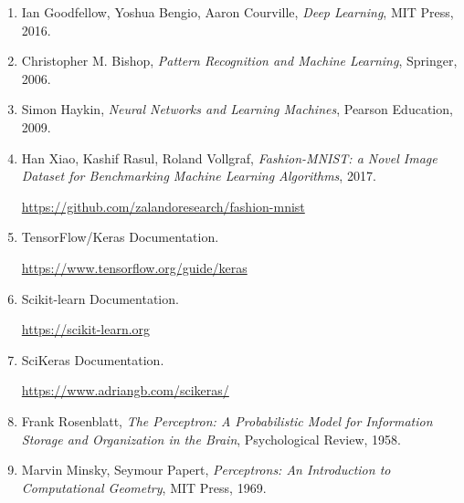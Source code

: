 \documentclass[11pt,a4paper]{article}
\begin{document}
\begin{enumerate}

\item Ian Goodfellow,
Yoshua Bengio,
Aaron Courville,
\textit{Deep Learning},
MIT Press,
2016.

\item Christopher M. Bishop,
\textit{Pattern Recognition and Machine Learning},
Springer,
2006.

\item Simon Haykin,
\textit{Neural Networks and Learning Machines},
Pearson Education,
2009.

\item Han Xiao, Kashif Rasul, Roland Vollgraf,
\textit{Fashion-MNIST: a Novel Image Dataset for Benchmarking Machine Learning Algorithms},
2017.

\url{https://github.com/zalandoresearch/fashion-mnist}

\item TensorFlow/Keras Documentation.

\url{https://www.tensorflow.org/guide/keras}

\item Scikit-learn Documentation.

\url{https://scikit-learn.org}

\item SciKeras Documentation.

\url{https://www.adriangb.com/scikeras/}

\item Frank Rosenblatt,
\textit{The Perceptron: A Probabilistic Model for Information Storage and Organization in the Brain},
Psychological Review,
1958.

\item Marvin Minsky, Seymour Papert,
\textit{Perceptrons: An Introduction to Computational Geometry},
MIT Press,
1969.

\end{enumerate}

\vfill
\end{document}
